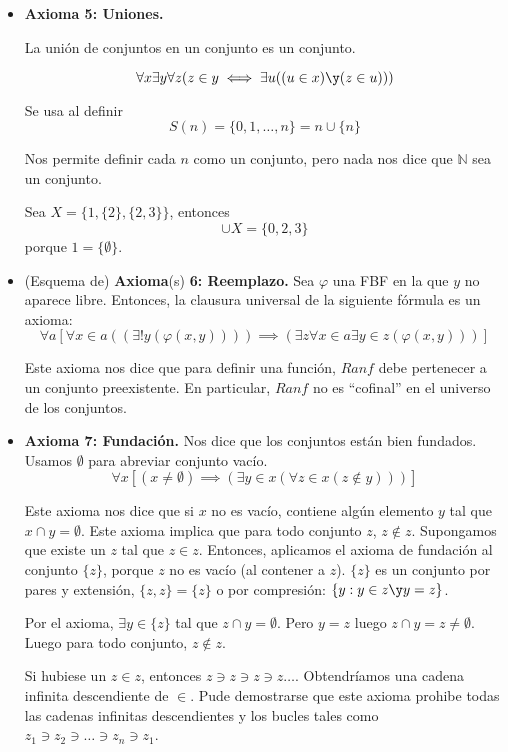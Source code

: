 	\begin{itemize}
		\item \textbf{Axioma 5: Uniones.}
		  
		 La unión de conjuntos en un conjunto es un conjunto.
		 
		 $$\forall x \exists y \forall z (z\in y\iff\exists u((u\in x)\y (z\in u)))$$
		 
		 Se usa al definir $$S(n) = \{0, 1,\hdots,n\} = n\cup \{n\}$$
		 
		 Nos permite definir cada $n$ como un conjunto, pero nada nos dice que $\mathbb{N}$ sea un conjunto.		 
		 \begin{example}
			Sea $X=\{1,\{2\},\{2,3\}\}$, entonces
			$$\cup X = \{0, 2, 3\}$$ porque $1=\{\emptyset\}$.
		 \end{example}
		 
		 \item (Esquema de) \textbf{Axioma}(s) \textbf{6: Reemplazo.}
		 Sea $\varphi$ una FBF en la que $y$ no aparece libre. Entonces, la clausura universal de la siguiente fórmula es un axioma:
		 $$\forall a \left[\forall x\in a ((\exists! y (\varphi(x,y))))\implies (\exists z \forall x \in a \exists y \in z (\varphi(x,y)))\right]$$
		 
		 Este axioma nos dice que para definir una función, $Ran f$ debe pertenecer a un conjunto preexistente. En particular, $Ranf$ no es ``cofinal'' en el universo de los conjuntos.
		 
		 \item \textbf{Axioma 7: Fundación.}
		 Nos dice que los conjuntos están bien fundados. Usamos $\emptyset$ para abreviar conjunto vacío.
		 $$\forall x \left[(x\neq \emptyset)\implies (\exists y \in x (\forall z \in x (z\notin y)))\right]$$
		 
		 Este axioma nos dice que si $x$ no es vacío, contiene algún elemento $y$ tal que $x\cap y = \emptyset$. Este axioma implica que para todo conjunto $z$, $z\notin z$. Supongamos que existe un $z$ tal que $z\in z$. Entonces, aplicamos el axioma de fundación al conjunto $\{z\}$, porque $z$ no es vacío (al contener a $z$).  $\{z\}$ es un conjunto por pares y extensión, $\{z,z\} = \{z\}$ o por compresión: $\{y : y\in z \y  y=z\}$.
		 
		 Por el axioma, $\exists y\in\{z\}$ tal que $z\cap y=\emptyset$. Pero $y=z$ luego $z\cap y = z \neq \emptyset$. Luego para todo conjunto, $z\notin z$.
		 
		 \begin{obs}
		 	Si hubiese un $z\in z$, entonces $z\ni z\ni z\ni z\hdots$. Obtendríamos una cadena infinita descendiente de $\in$.
		 	Pude demostrarse que este axioma prohibe todas las cadenas infinitas descendientes y los bucles tales como $z_1\ni z_2\ni \hdots \ni z_n \ni z_1$.
		 \end{obs}
		 

\end{itemize}
